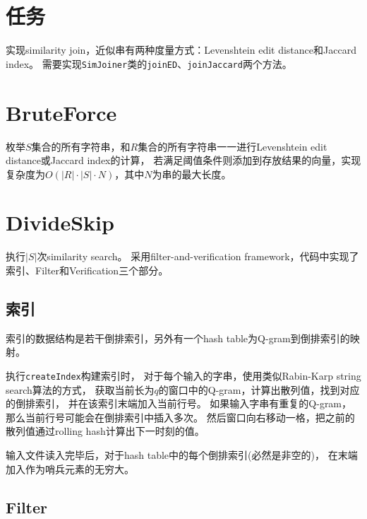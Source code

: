 \title{}
\author{MaskRay}
\maketitle

\section{任务}

实现similarity join，近似串有两种度量方式：Levenshtein edit distance和Jaccard index。
需要实现\texttt{SimJoiner}类的\texttt{joinED}、\texttt{joinJaccard}两个方法。

\section{BruteForce}

枚举$S$集合的所有字符串，和$R$集合的所有字符串一一进行Levenshtein edit distance或Jaccard index的计算，
若满足阈值条件则添加到存放结果的向量，实现复杂度为$O(|R|\cdot |S|\cdot N)$，其中$N$为串的最大长度。

\section{DivideSkip}

执行$|S|$次similarity search。
采用filter-and-verification framework，代码中实现了索引、Filter和Verification三个部分。

\subsection{索引}

索引的数据结构是若干倒排索引，另外有一个hash table为Q-gram到倒排索引的映射。

执行\texttt{createIndex}构建索引时，
对于每个输入的字串，使用类似Rabin-Karp string search算法的方式，
获取当前长为$q$的窗口中的Q-gram，计算出散列值，找到对应的倒排索引，
并在该索引末端加入当前行号。
如果输入字串有重复的Q-gram，那么当前行号可能会在倒排索引中插入多次。
然后窗口向右移动一格，把之前的散列值通过rolling hash计算出下一时刻的值。

输入文件读入完毕后，对于hash table中的每个倒排索引(必然是非空的)，
在末端加入作为哨兵元素的无穷大。

\subsection{Filter}

